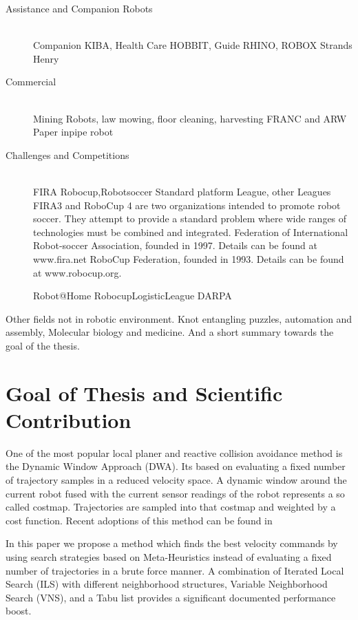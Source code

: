 \begin{description}
\item[Assistance and Companion Robots]\hfill \\
Companion KIBA, 
Health Care HOBBIT, 
Guide RHINO, ROBOX
Strands Henry

\item[Commercial]\hfill \\
Mining Robots, law mowing, floor cleaning, harvesting
FRANC and ARW Paper
inpipe robot \cite{mateos2013inpipe}

\item[Challenges and Competitions]\hfill \\
FIRA
Robocup,Robotsoccer Standard platform League, other Leagues
FIRA3 and RoboCup 4 are two organizations intended to promote robot soccer. They
attempt to provide a standard problem where wide ranges of technologies must be combined
and integrated.
Federation of International Robot-soccer Association, founded in 1997. Details can be found at www.fira.net
RoboCup Federation, founded in 1993. Details can be found at www.robocup.org.

Robot@Home
RobocupLogisticLeague
DARPA

\end{description}

Other fields not in robotic environment. Knot entangling puzzles, automation and assembly, Molecular biology and medicine.
And a short summary towards the goal of the thesis.

\section{Goal of Thesis and Scientific Contribution}\label{sec:goal}


One of the most popular local planer and reactive collision avoidance method is the Dynamic Window Approach (DWA)\cite{DWA1997}. Its based on evaluating a fixed number of trajectory samples in a reduced velocity space. 
A dynamic window around the current robot fused with the current sensor readings of the robot represents a so called costmap.
Trajectories are sampled into that costmap and weighted by a cost function.
Recent adoptions of this method can be found in \cite{conf/icra/SederP07}\cite{DBLP:conf/icra/Marder-EppsteinBFGK10}

In this paper we propose a method which finds the best velocity commands by using search strategies based on Meta-Heuristics instead of evaluating a fixed number of trajectories in a brute force manner.
A combination of Iterated Local Search (ILS) with different neighborhood structures, Variable Neighborhood Search (VNS), and a Tabu list provides a significant documented performance boost. 

